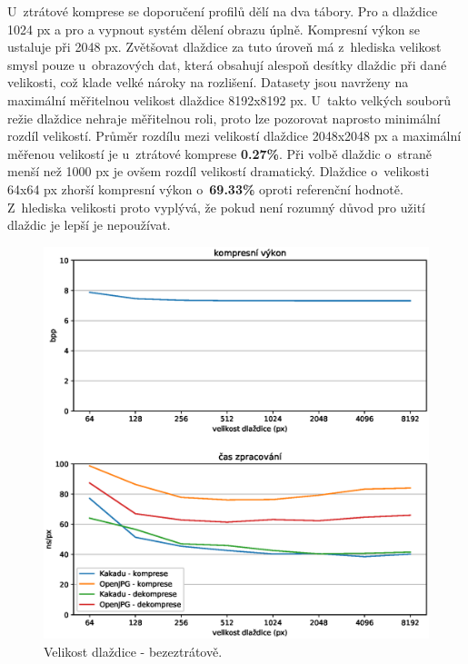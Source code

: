 \clearpage

U~ztrátové komprese se doporučení profilů dělí na dva tábory. Pro  a  dlaždice 1024 px a pro  a  vypnout systém dělení obrazu úplně. Kompresní výkon se ustaluje při 2048 px. Zvětšovat dlaždice za tuto úroveň má z~hlediska velikost smysl pouze u~obrazových dat, která obsahují alespoň desítky dlaždic při dané velikosti, což klade velké nároky na rozlišení. Datasety jsou navrženy na maximální měřitelnou velikost dlaždice 8192x8192 px. U~takto velkých souborů režie dlaždice nehraje měřitelnou roli, proto lze pozorovat naprosto minimální rozdíl velikostí. Průměr rozdílu mezi velikostí dlaždice 2048x2048 px a maximální měřenou velikostí je u~ztrátové komprese \textbf{0.27\%}. Při volbě dlaždic o~straně menší než 1000 px je ovšem rozdíl velikostí dramatický. Dlaždice o~velikosti 64x64 px zhorší kompresní výkon o~\textbf{69.33\%} oproti referenční hodnotě. Z~hlediska velikosti proto vyplývá, že pokud není rozumný důvod pro užití dlaždic je lepší je nepoužívat. 

\begin{figure}[hbt!]
  \centering
  \hspace*{-0.75cm}
  \includegraphics[width=16cm]{obrazky-figures/tiles/fotky_full_tiles.eps}
  \caption{Velikost dlaždice - bezeztrátově.}
\end{figure}

